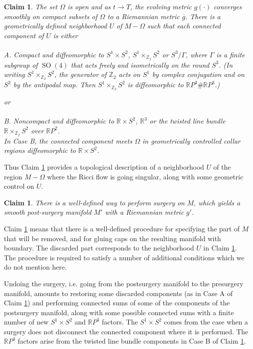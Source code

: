 \documentclass[12pt]{amsart}
\newcommand{\R}{{\mathbb R}}
\newcommand{\SO}{\operatorname{SO}}
\newcommand{\Z}{{\mathbb Z}}
\newcommand{\ra}{\rightarrow}
\numberwithin{equation}{section}
\theoremstyle{plain}
\newtheorem{claim}[equation]{Claim}
\theoremstyle{definition}
\theoremstyle{remark}
\begin{document}
\begin{claim} \cite{Perelman2} \label{introclaim1}
The set $\Omega$ is  open and as $t\ra T$, the evolving metric
$g(\cdot)$ converges smoothly 
on compact subsets of $\Omega$ to
a Riemannian metric $\overline{g}$.  
There is a geometrically defined neighborhood
$U$ of $M - \Omega$ such that each connected component of $U$
is either \\ \\
\noindent
A. Compact and diffeomorphic to $S^1 \times S^2$,
$S^1 \times_{\Z_2} S^2$ or $S^3/\Gamma$, where $\Gamma$ is a finite
subgroup of $\SO(4)$ that acts freely and isometrically on the round $S^3$.
(In writing $S^1 \times_{\Z_2} S^2$, the generator of $\Z_2$ acts on
$S^1$ by complex conjugation and on $S^2$ by the antipodal map.
Then $S^1 \times_{\Z_2} S^2$ is diffeomorphic to $\R P^3 \# \R P^3$.)

or \\ \\
\noindent
B. Noncompact and diffeomorphic to $\R\times S^2$,
$\R^3$
or the twisted line
bundle $\R \times_{\Z_2} S^2$ over $\R P^2$.  \\

In Case B, the connected component meets $\Omega$ in 
geometrically controlled collar regions diffeomorphic to $\R\times S^2$. 
\end{claim}

Thus Claim \ref{introclaim1} provides a topological description of 
a neighborhood $U$ of the region
$M-\Omega$ where the Ricci flow is going singular, along with some
geometric control on $U$.


\begin{claim} \cite{Perelman2} \label{introclaim2}
There is a well-defined way 
to perform surgery on $M$, which yields a smooth  post-surgery  
manifold $M'$ with a Riemannian metric $g'$.
\end{claim}

Claim \ref{introclaim2} means that there is a well-defined 
procedure for  specifying the part of $M$ that will be removed, and
for gluing caps on the resulting manifold with boundary.  
The discarded part corresponds to the neighborhood $U$ in Claim \ref{introclaim1}.
The procedure is required to satisfy a number
of additional conditions which we do not mention here.

Undoing the surgery, i.e. going from the postsurgery manifold to the
presurgery manifold, amounts to restoring some discarded 
components (as in Case A of Claim \ref{introclaim1})
and performing connected sums of some
of the components of the postsurgery manifold, along with some
possible connected sums with a finite number of new $S^1 \times S^2$ and
$\R P^3$ factors.  The $S^1 \times S^2$ comes from the case when a
surgery does not disconnect the connected component where it is
performed.  The $\R P^3$ factors arise from the twisted line bundle
components in Case B of Claim \ref{introclaim1}.
\end{document}
